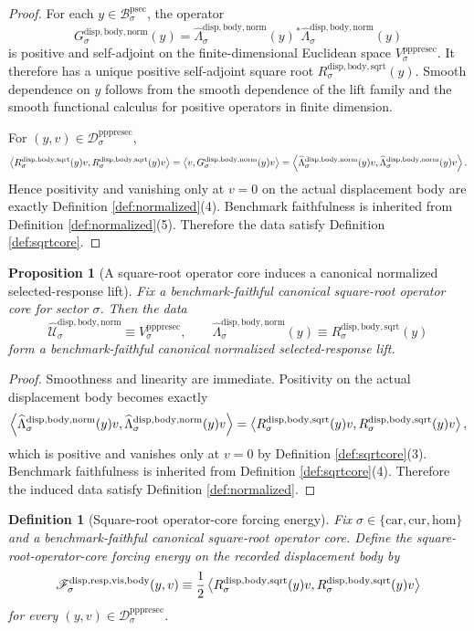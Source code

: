\documentclass[11pt]{article}
\newcommand{\Car}{\mathrm{car}}
\newcommand{\Cur}{\mathrm{cur}}
\newcommand{\Hom}{\mathrm{hom}}
\newcommand{\ProtoSectionBody}[1]{\mathcal B_{#1}^{\mathrm{psec}}}
\newcommand{\PrePreProtoSectionVertical}[1]{V_{#1}^{\mathrm{pppresec}}}
\newcommand{\PrePreProtoSectionResidualBody}[1]{\mathcal D_{#1}^{\mathrm{pppresec}}}
\newcommand{\VisibleBodyForcingLaw}[1]{\mathscr F_{#1}^{\mathrm{disp,resp,vis,body}}}
\newcommand{\NormalizedLiftCarrier}[1]{\widehat{\mathcal U}_{#1}^{\mathrm{disp,body,norm}}}
\newcommand{\NormalizedSelectedResponseLift}[1]{\widehat{\Lambda}_{#1}^{\mathrm{disp,body,norm}}}
\newcommand{\SquareRootOperator}[1]{R_{#1}^{\mathrm{disp,body,sqrt}}}
\newcommand{\GramOperator}[1]{G_{#1}^{\mathrm{disp,body,norm}}}
\newtheorem{definition}{Definition}
\newtheorem{proposition}{Proposition}
\begin{document}
\begin{proof}
For each \(y\in\ProtoSectionBody{\sigma}\), the operator
\[
\GramOperator{\sigma}(y)
=
\NormalizedSelectedResponseLift{\sigma}(y)^*
\NormalizedSelectedResponseLift{\sigma}(y)
\]
is positive and self-adjoint on the finite-dimensional Euclidean space \(\PrePreProtoSectionVertical{\sigma}\). It therefore has a unique positive self-adjoint square root \(\SquareRootOperator{\sigma}(y)\). Smooth dependence on \(y\) follows from the smooth dependence of the lift family and the smooth functional calculus for positive operators in finite dimension.

For \((y,v)\in\PrePreProtoSectionResidualBody{\sigma}\),
\[
\ev{
\SquareRootOperator{\sigma}(y)v,
\SquareRootOperator{\sigma}(y)v
}
=
\ev{
v,\GramOperator{\sigma}(y)v
}
=
\ev{
\NormalizedSelectedResponseLift{\sigma}(y)v,
\NormalizedSelectedResponseLift{\sigma}(y)v
}.
\]
Hence positivity and vanishing only at \(v=0\) on the actual displacement body are exactly Definition \ref{def:normalized}(4). Benchmark faithfulness is inherited from Definition \ref{def:normalized}(5). Therefore the data satisfy Definition \ref{def:sqrtcore}.
\end{proof}

\begin{proposition}[A square-root operator core induces a canonical normalized selected-response lift]
\label{prop:lift}
Fix a benchmark-faithful canonical square-root operator core for sector \(\sigma\). Then the data
\[
\NormalizedLiftCarrier{\sigma}
\equiv
\PrePreProtoSectionVertical{\sigma},
\qquad
\NormalizedSelectedResponseLift{\sigma}(y)
\equiv
\SquareRootOperator{\sigma}(y)
\]
form a benchmark-faithful canonical normalized selected-response lift.
\end{proposition}

\begin{proof}
Smoothness and linearity are immediate. Positivity on the actual displacement body becomes exactly
\[
\ev{
\NormalizedSelectedResponseLift{\sigma}(y)v,
\NormalizedSelectedResponseLift{\sigma}(y)v
}
=
\ev{
\SquareRootOperator{\sigma}(y)v,
\SquareRootOperator{\sigma}(y)v
},
\]
which is positive and vanishes only at \(v=0\) by Definition \ref{def:sqrtcore}(3). Benchmark faithfulness is inherited from Definition \ref{def:sqrtcore}(4). Therefore the induced data satisfy Definition \ref{def:normalized}.
\end{proof}

\begin{definition}[Square-root operator-core forcing energy]
\label{def:energy}
Fix \(\sigma\in\{\Car,\Cur,\Hom\}\) and a benchmark-faithful canonical square-root operator core. Define the square-root-operator-core forcing energy on the recorded displacement body by
\begin{equation}
\VisibleBodyForcingLaw{\sigma}(y,v)
\equiv
\frac{1}{2}
\ev{
\SquareRootOperator{\sigma}(y)v,
\SquareRootOperator{\sigma}(y)v
}
\label{eq:forcing}
\end{equation}
for every \((y,v)\in\PrePreProtoSectionResidualBody{\sigma}\).
\end{definition}
\end{document}
